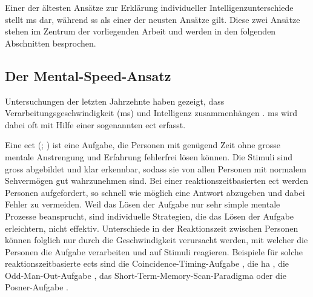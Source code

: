 \documentclass[11pt, twoside, a4paper]{book}		%
\begin{document}
Einer der ältesten Ansätze zur Erklärung individueller Intelligenzunterschiede stellt \gls{ms} dar, während \gls{ss} als einer der neusten Ansätze gilt. Diese zwei Ansätze stehen im Zentrum der vorliegenden Arbeit und werden in den folgenden Abschnitten besprochen.

\subsection{Der Mental-Speed-Ansatz \label{subsec:Der_Mental-Speed-Ansatz}}

Untersuchungen der letzten Jahrzehnte  haben gezeigt, dass Verarbeitungsgeschwindigkeit (\gls{ms}) und Intelligenz zusammenhängen \citep[für Übersichtsarbeiten siehe][]{Deary2000a, Jensen2006, Sheppard2008}. \gls{ms} wird dabei oft mit Hilfe einer sogenannten \gls{ect} erfasst.

Eine \gls{ect} (\citealp[S. 11]{Carroll1993}; \citealp[S. 203--209]{Jensen1998a}) ist eine Aufgabe, die Personen mit genügend Zeit ohne grosse mentale Anstrengung und Erfahrung fehlerfrei lösen können. Die Stimuli sind gross abgebildet und klar erkennbar, sodass sie von allen Personen mit normalem Sehvermögen gut wahrzunehmen sind. Bei einer reaktionszeitbasierten \gls{ect} werden Personen aufgefordert, so schnell wie möglich eine Antwort abzugeben und dabei Fehler zu vermeiden. Weil das Lösen der Aufgabe nur sehr simple mentale Prozesse beansprucht, sind individuelle Strategien, die das Lösen der Aufgabe erleichtern, nicht effektiv. Unterschiede in der Reaktionszeit zwischen Personen können folglich nur durch die Geschwindigkeit verursacht werden, mit welcher die Personen die Aufgabe verarbeiten und auf Stimuli reagieren.
Beispiele für solche reaktionszeitbasierte \glspl{ect} sind
die Coincidence-Timing-Aufgabe \citep[bei welcher ein räumliches Zusammentreffen von zwei Stimuli so rasch als möglich erkannt werden muss;][]{Smith1987a}, 
die \gls{ha} \citep[zur Erfassung einfacher Reaktionszeit und der Reaktionszeit für eine Mehrfachauswahl;][]{Hick1952}, 
die Odd-Man-Out-Aufgabe \citep[zur Erfassung der Reaktionszeit für eine Mehrfachauswahl;][]{Frearson1986},
das Short-Term-Memory-Scan-Paradigma \citep[zur Erfassung der benötigten Zeit für einen Zugriff auf das Kurzzeitgedächtnis;][]{Sternberg1966, Sternberg1969}
oder die Posner-Aufgabe \citep[zur Erfassung der benötigten Zeit für einen Zugriff auf das Langzeitgedächtnis;][]{Posner1969}.
\end{document}
